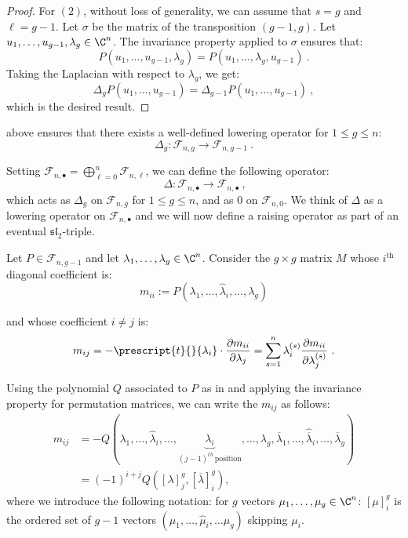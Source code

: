 \documentclass[11pt,letterpaper,english]{amsart}
\numberwithin{equation}{subsection}
\numberwithin{equation}{section}
\newcommand\cF{{\mathcal F}}
\theoremstyle{plain}
\theoremstyle{remark}
\begin{document}
\begin{proof}
For $(2)$, without loss of generality, we can assume that $s=g$ and $\ell=g-1$. Let $\sigma$ be the matrix of the transposition $(g-1,g)$. Let $u_1,\ldots,u_{g-1},\lambda_g\in \C^n$. The invariance property applied to $\sigma$ ensures that: 
\[P(u_1,\ldots,u_{g-1},\lambda_g)=P(u_1,\ldots,\lambda_g,u_{g-1})~.\]
Taking the Laplacian with respect to $\lambda_g$, we get: 
\[\Delta_g P(u_1,\ldots,u_{g-1})=\Delta_{g-1}P(u_1,\ldots,u_{g-1})~,\]
which is the desired result.
\end{proof}

 above ensures that there exists a well-defined lowering operator for $1\leq g \leq n$:
\[\Delta_g:\cF_{n,g}\rightarrow \cF_{n,g-1}~.\] 

Setting $\cF_{n,\bullet}=\bigoplus_{\ell=0}^{n}\cF_{n,\ell}$, we can define the following operator:  
\[\
\Delta:\cF_{n,\bullet}\rightarrow \cF_{n,\bullet}~,\]
which acts as $\Delta_g$ on $\cF_{n,g}$ for $1\leq g\leq n$, and as 0 on $\cF_{n,0}$. We think of $\Delta$ as a lowering operator on $\cF_{n,\bullet}$ and we will now define a raising operator as part of an eventual $\mathfrak s \mathfrak l_2$-triple.\medskip

Let $P\in\cF_{n,g-1}$ and let $\lambda_1,\ldots,\lambda_g\in \C^n$. Consider the $g\times g$ matrix $M$ whose $i^\textrm{th}$  diagonal coefficient is:
\[m_{ii}:=P(\lambda_1,\ldots,\widehat{\lambda}_i,\ldots,\lambda_g)\]

and whose coefficient $i\neq j$ is:
\[m_{ij}=-\prescript{t}{}{\lambda_i}\cdot\frac{\partial m_{ii}}{\partial\lambda_j}=\sum_{s=1}^n{\lambda}_i^{(s)}\frac{\partial m_{ii}}{\partial \lambda_j^{(s)}}~.\]

Using the polynomial $Q$ associated to $P$ as in  and applying the invariance property for permutation matrices, we can write the $m_{ij}$ as follows:
\begin{align}\label{crucial}
   m_{ij}&=-Q(\lambda_1,\ldots,\widehat{\lambda}
   _i,\ldots,\underbrace{\lambda_i}_{(j-1)^{th}\, \textrm{position}},\ldots,\lambda_{g},\overline{\lambda}_1,\ldots,\widehat{\overline{\lambda}}_i,\ldots,\overline{\lambda}_{g})\\
   &=(-1)^{i+j}Q([\lambda]^g_j,[\overline{\lambda}]^g_i),
\end{align}
where we introduce the following notation: for $g$ vectors $\mu_1,\ldots,\mu_g\in \C^n$: $[\mu]_i^g$ is the ordered set of $g-1$ vectors $(\mu_1,\ldots,\widehat{\mu}_i,\ldots\mu_g)$ skipping $\mu_i$.
\end{document}
